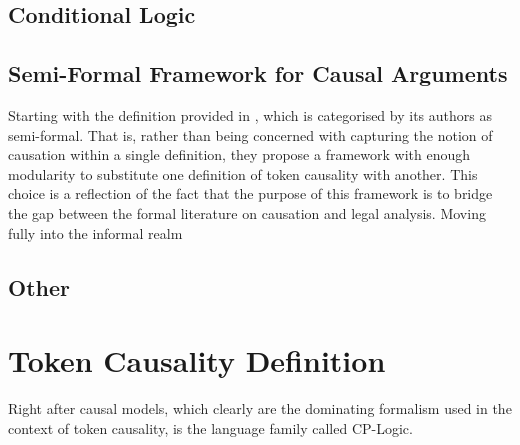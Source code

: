 \documentclass[11pt,a4paper]{book}
\theoremstyle{definition}
\theoremstyle{definition}
\theoremstyle{definition}
\theoremstyle{remark}
\begin{document}
\subsection{Conditional Logic}







\subsection{Semi-Formal Framework for Causal Arguments}

 Starting with the definition provided in \parencite{liepicna2020arguing}, which is categorised by its authors as semi-formal. That is, rather than being concerned with capturing the notion of causation within a single definition, they propose a framework with enough modularity to substitute one definition of token causality with another. This choice is a reflection of the fact that the purpose of this framework is to bridge the gap between the formal literature on causation and legal analysis. Moving fully into the informal realm
 
\subsection{Other}


\clearpage
\section{Token Causality Definition}

Right after causal models, which clearly are the dominating formalism used in the context of token causality, is the language family called CP-Logic.
\end{document}
